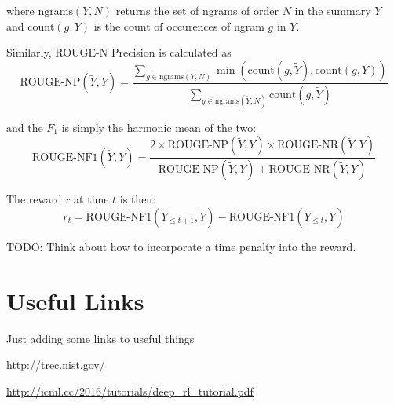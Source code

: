 \documentclass[12pt]{article}
\begin{document}
    where $\textrm{ngrams}(Y, N)$ returns the set of ngrams of order $N$ in 
    the summary $Y$ and $\textrm{count}(g, Y)$ is the count of occurences of
    ngram $g$ in $Y.$

    Similarly, ROUGE-N Precision is calculated as 
    \[ \textrm{ROUGE-NP}(\tilde{Y}, Y) = 
        \frac{\sum_{g \in \textrm{ngrams}(Y,N)} 
        \min \left(\textrm{count}(g, \tilde{Y}), \textrm{count}(g, Y)\right)}{
            \sum_{g \in \textrm{ngrams}(\tilde{Y},N)} 
            \textrm{count}(g, \tilde{Y})
        }
    \]

    and the $F_1$ is simply the harmonic mean of the two:
    \[ \textrm{ROUGE-NF1}(\tilde{Y}, Y) = \frac{ 2 \times 
    \textrm{ROUGE-NP}(\tilde{Y}, Y) \times \textrm{ROUGE-NR}(\tilde{Y}, Y)
    }{ \textrm{ROUGE-NP}(\tilde{Y}, Y) + \textrm{ROUGE-NR}(\tilde{Y}, Y) } \]
        


    The reward $r$ at time $t$ is then:
    \[ r_t = \textrm{ROUGE-NF1}(\tilde{Y}_{\le t+1}, Y) - 
    \textrm{ROUGE-NF1}(\tilde{Y}_{\le t}, Y) \]

    TODO: Think about how to incorporate a time penalty into the reward.

\section{Useful Links}

Just adding some links to useful things 

\url{http://trec.nist.gov/}

\url{http://icml.cc/2016/tutorials/deep_rl_tutorial.pdf}
\end{document}
